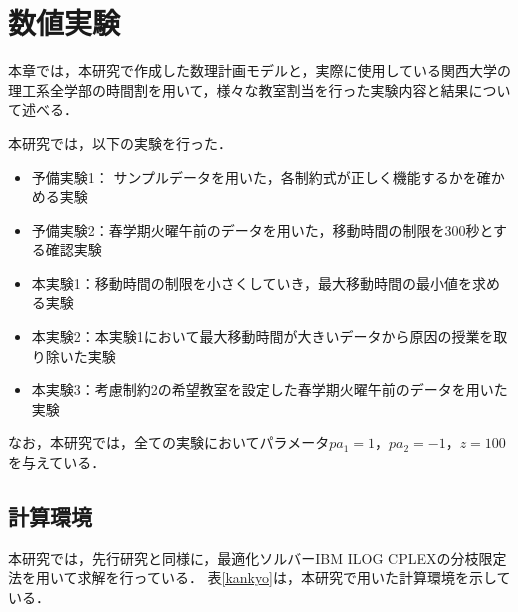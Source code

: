 \documentclass[12pt, a4paper, fleqn]{jreport}
\begin{document}
\setcounter{tocdepth}{2}
\setlength{\mathindent}{0zw}
\setcounter{totalnumber}{3}
\setcounter{topnumber}{3}
\renewcommand{\topfraction}{0.99}
\renewcommand{\bottomfraction}{0.99}
\renewcommand{\textfraction}{0.0}


\setlength{\textwidth}{\paperwidth}   %
\addtolength{\textwidth}{-2in}         %
\setlength{\textheight}{\paperheight} %
\addtolength{\textheight}{-2in}        %
\setlength{\topmargin}{0pt}            %
\addtolength{\topmargin}{-\headheight} %
\addtolength{\topmargin}{-\headsep}    %
\setlength{\oddsidemargin}{0pt}       %
\setlength{\evensidemargin}{0pt}      %


\fi



\chapter{数値実験}
本章では，本研究で作成した数理計画モデルと，実際に使用している関西大学の理工系全学部の時間割を用いて，様々な教室割当を行った実験内容と結果について述べる．

本研究では，以下の実験を行った．
\begin{itemize}
\item 予備実験1： サンプルデータを用いた，各制約式が正しく機能するかを確かめる実験
\item 予備実験2：春学期火曜午前のデータを用いた，移動時間の制限を300秒とする確認実験
\item 本実験1：移動時間の制限を小さくしていき，最大移動時間の最小値を求める実験
\item 本実験2：本実験1において最大移動時間が大きいデータから原因の授業を取り除いた実験
\item 本実験3：考慮制約2の希望教室を設定した春学期火曜午前のデータを用いた実験
\end{itemize}

なお，本研究では，全ての実験においてパラメータ$pa_1 = 1$，$pa_2 = -1$，$z = 100$を与えている．
\section{計算環境}
本研究では，先行研究と同様に，最適化ソルバーIBM ILOG CPLEXの分枝限定法を用いて求解を行っている．
表\ref{kankyo}は，本研究で用いた計算環境を示している．
\end{document}
